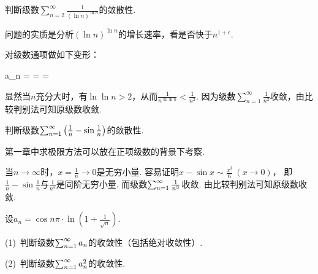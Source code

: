 \begin{example}
\label{ex:ch10-03}
判断级数$\sum_{n=2}^{\infty} \frac{1}{(\ln n)^{\ln n}}$的敛散性.
\end{example}

\begin{analysis}
问题的实质是分析$(\ln n)^{\ln n}$的增长速率，看是否快于$n^{1+\epsilon}$.
\end{analysis}

\begin{solution}
对级数通项做如下变形：
    \begin{eq1}
        a_n =  =  = 
    \end{eq1}

    显然当$n$充分大时，有$\ln \ln n > 2$，从而$\frac{1}{n^{\ln \ln n}} < \frac{1}{n^2}$.
    因为级数$\sum_{n=1}^{\infty} \frac{1}{n^2}$收敛，由比较判别法可知原级数收敛.
\end{solution}

\begin{example}
\label{ex:ch10-04}
判断级数$\ss \left( \frac{1}{n} - \sin \frac{1}{n} \right)$的敛散性.
\end{example}

\begin{analysis}
{第一章中求极限方法可以放在正项级数的背景下考察.}
\end{analysis}

\begin{solution}
当$n \to \infty$时，$x = \frac{1}{n} \to 0$是无穷小量.
    容易证明$x - \sin x \sim \frac{x^3}{6}~(x \to 0)$，
    即$\frac{1}{n} - \sin \frac{1}{n}$与$\frac{1}{n^3}$是同阶无穷小量.
    而级数$\ss \frac{1}{n^3}$收敛.
    由比较判别法可知原级数收敛.
\end{solution}

\begin{example}
\label{ex:ch10-05}
设$a_n = \cos n \pi \cdot \ln \left( 1 + \frac{1}{\sqrt{n}} \right)$.

(1)~判断级数$\ss a_n$的收敛性（包括绝对收敛性）.

(2)~判断级数$\ss a_n^2$的收敛性.
\end{example}

